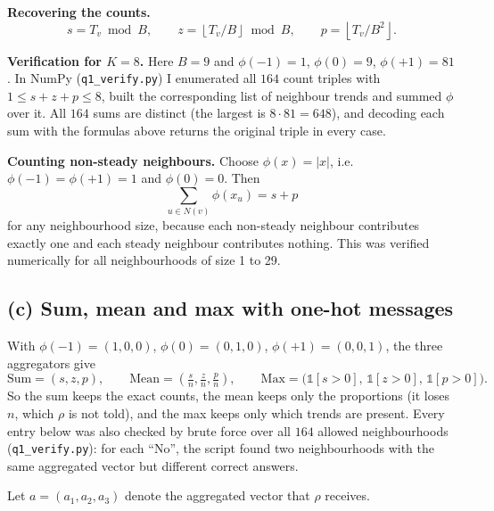 \documentclass[11pt, a4paper]{article}
\begin{document}
\textbf{Recovering the counts.}
\[
s = T_v \bmod B, \qquad z = \left\lfloor T_v / B \right\rfloor \bmod B, \qquad p = \left\lfloor T_v / B^2 \right\rfloor .
\]

\textbf{Verification for $K = 8$.} Here $B = 9$ and $\phi(-1) = 1$, $\phi(0) = 9$, $\phi(+1) = 81$. In NumPy (\texttt{q1\_verify.py}) I enumerated all $164$ count triples with $1 \le s + z + p \le 8$, built the corresponding list of neighbour trends and summed $\phi$ over it. All $164$ sums are distinct (the largest is $8 \cdot 81 = 648$), and decoding each sum with the formulas above returns the original triple in every case.

\textbf{Counting non-steady neighbours.} Choose $\phi(x) = |x|$, i.e.\ $\phi(-1) = \phi(+1) = 1$ and $\phi(0) = 0$. Then
\[
\sum_{u \in N(v)} \phi(x_u) = s + p
\]
for any neighbourhood size, because each non-steady neighbour contributes exactly one and each steady neighbour contributes nothing. This was verified numerically for all neighbourhoods of size 1 to 29.

\subsection*{(c) Sum, mean and max with one-hot messages}

With $\phi(-1) = (1,0,0)$, $\phi(0) = (0,1,0)$, $\phi(+1) = (0,0,1)$, the three aggregators give
\[
\text{Sum} = (s, z, p), \qquad \text{Mean} = \left(\tfrac{s}{n}, \tfrac{z}{n}, \tfrac{p}{n}\right), \qquad \text{Max} = \big(\mathbb{1}[s>0],\, \mathbb{1}[z>0],\, \mathbb{1}[p>0]\big).
\]
So the sum keeps the exact counts, the mean keeps only the proportions (it loses $n$, which $\rho$ is not told), and the max keeps only which trends are present. Every entry below was also checked by brute force over all $164$ allowed neighbourhoods (\texttt{q1\_verify.py}): for each ``No'', the script found two neighbourhoods with the same aggregated vector but different correct answers.

Let $a = (a_1, a_2, a_3)$ denote the aggregated vector that $\rho$ receives.
\end{document}

